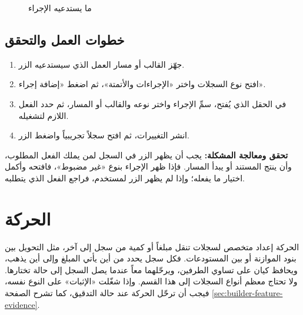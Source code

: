\begin{figure}[H]
\centering
{}
\rclegend
\caption{ما يستدعيه الإجراء}
\label{fig:builder-actions-model}
\end{figure}

\subsection{خطوات العمل والتحقق}
\begin{enumerate}
\item جهّز القالب أو مسار العمل الذي سيستدعيه الزر.
\item افتح نوع السجلات واختر «الإجراءات والأتمتة»، ثم اضغط «إضافة إجراء».
\item في الحقل الذي يُفتح، سمِّ الإجراء واختر نوعه والقالب أو المسار، ثم حدد الفعل اللازم لتشغيله.
\item انشر التغييرات، ثم افتح سجلاً تجريبياً واضغط الزر.
\end{enumerate}

\textbf{تحقق ومعالجة المشكلة:} يجب أن يظهر الزر في السجل لمن يملك الفعل المطلوب، وأن ينتج المستند أو يبدأ المسار. فإذا ظهر الإجراء بنوع «غير مضبوط»، فافتحه وأكمل اختيار ما يفعله؛ وإذا لم يظهر الزر لمستخدم، فراجع الفعل الذي يتطلبه.

\clearpage
\section{الحركة}
\label{sec:builder-feature-movement}

الحركة إعداد متخصص لسجلات تنقل مبلغاً أو كمية من سجل إلى آخر، مثل التحويل بين بنود الموازنة أو بين المستودعات. فكل سجل يحدد من أين يأتي المبلغ وإلى أين يذهب، ويحافظ كيان على تساوي الطرفين، ويرحّلهما معاً عندما يصل السجل إلى حالة تختارها. ولا تحتاج معظم أنواع السجلات إلى هذا القسم. وإذا شغّلت «الإثبات» على النوع نفسه، فيجب أن ترحّل الحركة عند حالة التدقيق، كما تشرح الصفحة \ref{sec:builder-feature-evidence}.

